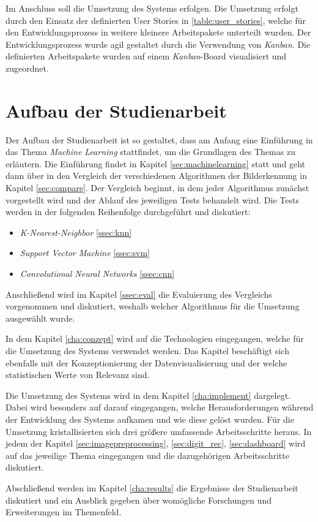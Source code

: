 Im Anschluss soll die Umsetzung des Systems erfolgen. Die Umsetzung erfolgt durch den Einsatz der definierten User Stories in \ref{table:user_stories}, welche für den Entwicklungsprozess in weitere kleinere Arbeitspakete unterteilt wurden. Der Entwicklungsprozess wurde agil gestaltet durch die Verwendung von \textit{Kanban}. Die definierten Arbeitspakete wurden auf einem \textit{Kanban}-Board visualisiert und zugeordnet.

\section{Aufbau der Studienarbeit}
Der Aufbau der Studienarbeit ist so gestaltet, dass am Anfang eine Einführung in das Thema \textit{Machine Learning} stattfindet, um die Grundlagen des Themas zu erläutern. Die Einführung findet in Kapitel \ref{sec:machinelearning} statt und geht dann über in den Vergleich der verschiedenen Algorithmen der Bilderkennung in Kapitel \ref{sec:compare}. Der Vergleich beginnt, in dem jeder Algorithmus zunächst vorgestellt wird und der Ablauf des jeweiligen Tests behandelt wird. Die Tests werden in der folgenden Reihenfolge durchgeführt und diskutiert:
\begin{itemize}
    \item \textit{K-Nearest-Neighbor} \ref{ssec:knn}
    \item \textit{Support Vector Machine} \ref{ssec:svm}
    \item \textit{Convolutional Neural Networks} \ref{ssec:cnn}
\end{itemize}

Anschließend wird im Kapitel \ref{ssec:eval} die Evaluierung des Vergleichs vorgenommen und diskutiert, weshalb welcher Algorithmus für die Umsetzung ausgewählt wurde.

In dem Kapitel \ref{cha:conzept} wird auf die Technologien eingegangen, welche für die Umsetzung des Systems verwendet werden. Das Kapitel beschäftigt sich ebenfalls mit der Konzeptionierung der Datenvisualisierung und der welche statistischen Werte von Relevanz sind.

Die Umsetzung des Systems wird in dem Kapitel \ref{cha:implement} dargelegt. Dabei wird besonders auf darauf eingegangen, welche Herausforderungen während der Entwicklung des Systems aufkamen und wie diese gelöst wurden. Für die Umsetzung kristallisierten sich drei größere umfassende Arbeitsschritte heraus. In jedem der Kapitel \ref{sec:imagepreprocessing}, \ref{sec:digit_rec}, \ref{sec:dashboard} wird auf das jeweilige Thema eingegangen und die dazugehörigen Arbeitsschritte diskutiert.

Abschließend werden im Kapitel \ref{cha:results} die Ergebnisse der Studienarbeit diskutiert und ein Ausblick gegeben über womögliche Forschungen und Erweiterungen im Themenfeld.